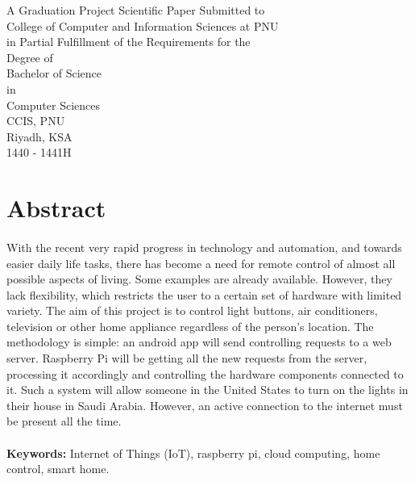 \documentclass[12pt]{paper}
\begin{document}
\begin{titlepage}
\begin{center}
		
		
		\vfill \normalsize
		A Graduation Project Scientific Paper Submitted to \\
		College of Computer and Information Sciences at PNU \\
		in Partial Fulfillment of the Requirements for the \\
		Degree of \\
		Bachelor of Science \\
		in \\
		Computer Sciences \\[5ex]
		CCIS, PNU \\
		Riyadh, KSA \\
		1440 - 1441H \\
	\end{center}
\end{titlepage}
\newpage
	
		\section*{Abstract}
		\paragraph{} With the recent very rapid progress in technology and automation, and towards easier daily life tasks, there has become a need for remote control of almost all possible aspects of living. Some examples are already available. However, they lack flexibility, which restricts the user to a certain set of hardware with limited variety. The aim of this project is to control light buttons, air conditioners, television or other home appliance regardless of the person's location. The methodology is simple: an android app will send controlling requests to a web server. Raspberry Pi will be getting all the new requests from the server, processing it accordingly and controlling the hardware components connected to it. Such a system will allow someone in the United States to turn on the lights in their house in Saudi Arabia. However, an active connection to the internet must be present all the time. 
		\paragraph{} \textbf{Keywords:} Internet of Things (IoT), raspberry pi, cloud computing, home control, smart home.
	
\end{document}
